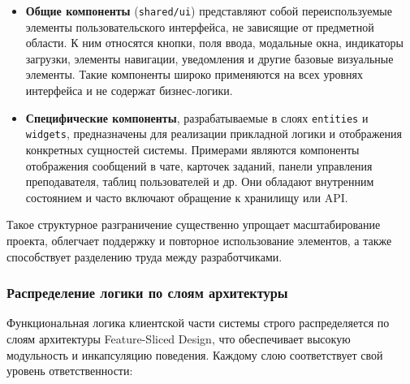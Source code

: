 \begin{itemize}
  \item \textbf{Общие компоненты} (\texttt{shared/ui}) представляют собой переиспользуемые элементы пользовательского интерфейса, не зависящие от предметной области. К ним относятся кнопки, поля ввода, модальные окна, индикаторы загрузки, элементы навигации, уведомления и другие базовые визуальные элементы. Такие компоненты широко применяются на всех уровнях интерфейса и не содержат бизнес-логики.
  
  \item \textbf{Специфические компоненты}, разрабатываемые в слоях \texttt{entities} и \texttt{widgets}, предназначены для реализации прикладной логики и отображения конкретных сущностей системы. Примерами являются компоненты отображения сообщений в чате, карточек заданий, панели управления преподавателя, таблиц пользователей и др. Они обладают внутренним состоянием и часто включают обращение к хранилищу или API.
\end{itemize}

Такое структурное разграничение существенно упрощает масштабирование проекта, облегчает поддержку и повторное использование элементов, а также способствует разделению труда между разработчиками.

\subsubsection{Распределение логики по слоям архитектуры}

Функциональная логика клиентской части системы строго распределяется по слоям архитектуры Feature-Sliced Design, что обеспечивает высокую модульность и инкапсуляцию поведения. Каждому слою соответствует свой уровень ответственности:

